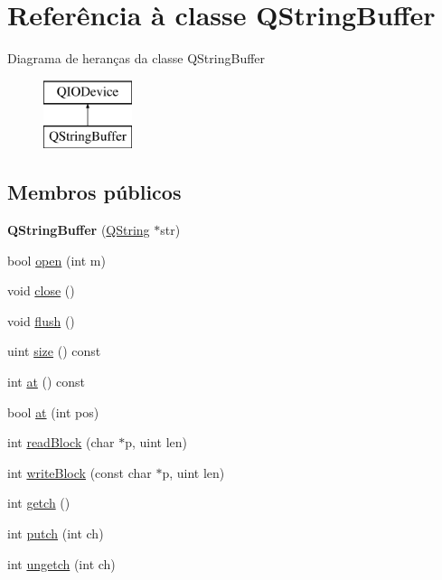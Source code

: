 \hypertarget{class_q_string_buffer}{\section{Referência à classe Q\-String\-Buffer}
\label{class_q_string_buffer}
}
Diagrama de heranças da classe Q\-String\-Buffer\begin{figure}[H]
\begin{center}
\leavevmode
\includegraphics[height=2.000000cm]{class_q_string_buffer}
\end{center}
\end{figure}
\subsection*{Membros públicos}
\begin{DoxyCompactItemize}
\item 
\hypertarget{class_q_string_buffer_a475d882fbfff397073f7a0aaa263012c}{{\bfseries Q\-String\-Buffer} (\hyperlink{class_q_string}{Q\-String} $\ast$str)}\label{class_q_string_buffer_a475d882fbfff397073f7a0aaa263012c}

\item 
bool \hyperlink{class_q_string_buffer_a2c4ec4ed8d34c778b4e7c7b4db3de4b2}{open} (int m)
\item 
void \hyperlink{class_q_string_buffer_a5ae591df94fc66ccb85cbb6565368bca}{close} ()
\item 
void \hyperlink{class_q_string_buffer_adac116554b543b7c4228c018a85882f5}{flush} ()
\item 
uint \hyperlink{class_q_string_buffer_a7e63723212bed1ca52f0fe57e58b812e}{size} () const 
\item 
int \hyperlink{class_q_string_buffer_a3bce8d0bb4d6fbaa012b9a61c3910907}{at} () const 
\item 
bool \hyperlink{class_q_string_buffer_aba2e4f48241029c25494e2645d088440}{at} (int pos)
\item 
int \hyperlink{class_q_string_buffer_ae8ab7313ab944afd8032aabb8cc86aeb}{read\-Block} (char $\ast$p, uint len)
\item 
int \hyperlink{class_q_string_buffer_abe680b02f9e888aee5900fe3e80d4a3b}{write\-Block} (const char $\ast$p, uint len)
\item 
int \hyperlink{class_q_string_buffer_a160f6d2893bb6b89ab3ad5d863c20e3d}{getch} ()
\item 
int \hyperlink{class_q_string_buffer_a5b7f09997f2156ba7b311416fee8a18e}{putch} (int ch)
\item 
int \hyperlink{class_q_string_buffer_af82349e8f3aff6638f73c78e6c6255a0}{ungetch} (int ch)
\end{DoxyCompactItemize}
